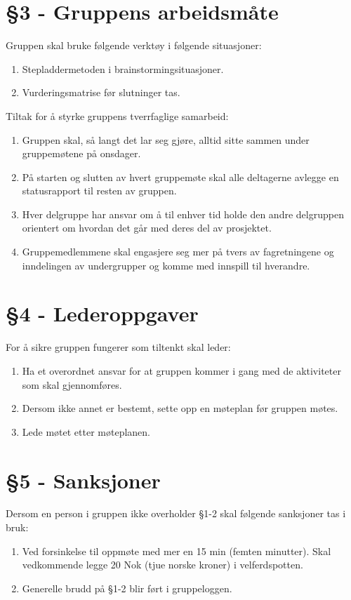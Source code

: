 \section*{§3 - Gruppens arbeidsmåte}
Gruppen skal bruke følgende verktøy i følgende situasjoner:
\begin{enumerate}
\item Stepladdermetoden i brainstormingsituasjoner.
\item Vurderingsmatrise før slutninger tas.
\end{enumerate}
Tiltak for å styrke gruppens tverrfaglige samarbeid:
\begin{enumerate}
\item Gruppen skal, så langt det lar seg gjøre, alltid sitte sammen under gruppemøtene på onsdager.
\item På starten og slutten av hvert gruppemøte skal alle deltagerne avlegge en statusrapport til resten av gruppen.
\item Hver delgruppe har ansvar om å til enhver tid holde den andre delgruppen orientert om hvordan det går med deres del av prosjektet. 
\item Gruppemedlemmene skal engasjere seg mer på tvers av fagretningene og inndelingen av undergrupper og komme med innspill til hverandre. 
\end{enumerate}
\section*{§4 - Lederoppgaver}
For å sikre gruppen fungerer som tiltenkt skal leder:
\begin{enumerate}
\item Ha et overordnet ansvar for at gruppen kommer i gang med de aktiviteter som skal gjennomføres.
\item Dersom ikke annet er bestemt, sette opp en møteplan før gruppen møtes.
\item Lede møtet etter møteplanen.
\end{enumerate}
\section*{§5 - Sanksjoner}
Dersom en person i gruppen ikke overholder §1-2 skal følgende sanksjoner tas i bruk:
\begin{enumerate}
\item Ved forsinkelse til oppmøte med mer en 15 min (femten minutter). Skal vedkommende legge 20 Nok (tjue norske kroner) i velferdspotten. 
\item Generelle brudd på §1-2 blir ført i gruppeloggen. 
\end{enumerate}
